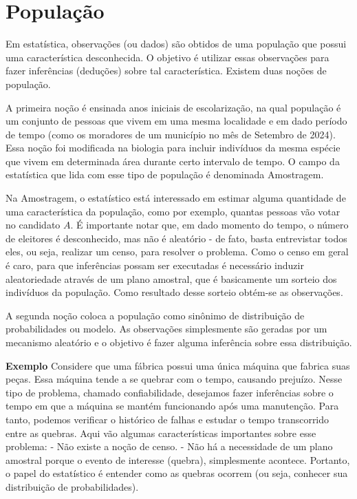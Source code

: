 \documentclass[
  letterpaper,
  DIV=11,
  numbers=noendperiod]{scrreprt}
\begin{document}
\section{População}\label{populauxe7uxe3o}

Em estatística, observações (ou dados) são obtidos de uma população que
possui uma característica desconhecida. O objetivo é utilizar essas
observações para fazer inferências (deduções) sobre tal característica.
Existem duas noções de população.

A primeira noção é ensinada anos iniciais de escolarização, na qual
população é um conjunto de pessoas que vivem em uma mesma localidade e
em dado período de tempo (como os moradores de um município no mês de
Setembro de 2024). Essa noção foi modificada na biologia para incluir
indivíduos da mesma espécie que vivem em determinada área durante certo
intervalo de tempo. O campo da estatística que lida com esse tipo de
população é denominada Amostragem.

Na Amostragem, o estatístico está interessado em estimar alguma
quantidade de uma característica da população, como por exemplo, quantas
pessoas vão votar no candidato \(A\). É importante notar que, em dado
momento do tempo, o número de eleitores é desconhecido, mas não é
aleatório - de fato, basta entrevistar todos eles, ou seja, realizar um
censo, para resolver o problema. Como o censo em geral é caro, para que
inferências possam ser executadas é necessário induzir aleatoriedade
através de um plano amostral, que é basicamente um sorteio dos
indivíduos da população. Como resultado desse sorteio obtém-se as
observações.

A segunda noção coloca a população como sinônimo de distribuição de
probabilidades ou modelo. As observações simplesmente são geradas por um
mecanismo aleatório e o objetivo é fazer alguma inferência sobre essa
distribuição.

\textbf{Exemplo} Considere que uma fábrica possui uma única máquina que
fabrica suas peças. Essa máquina tende a se quebrar com o tempo,
causando prejuízo. Nesse tipo de problema, chamado confiabilidade,
desejamos fazer inferências sobre o tempo em que a máquina se mantém
funcionando após uma manutenção. Para tanto, podemos verificar o
histórico de falhas e estudar o tempo transcorrido entre as quebras.
Aqui vão algumas características importantes sobre esse problema: - Não
existe a noção de censo. - Não há a necessidade de um plano amostral
porque o evento de interesse (quebra), simplesmente acontece. Portanto,
o papel do estatístico é entender como as quebras ocorrem (ou seja,
conhecer sua distribuição de probabilidades).
\end{document}
